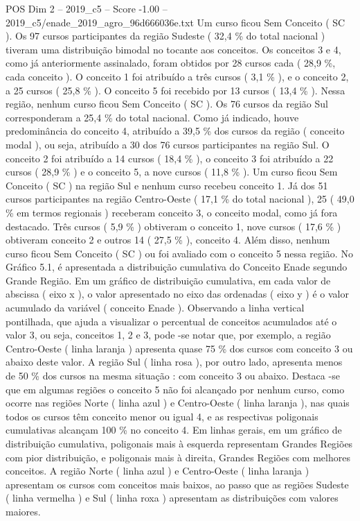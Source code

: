 \begin{textsample}{POS Dim 2 – 2019\_c5 – Score -1.00 – 2019\_c5/enade\_2019\_agro\_96d666036e.txt}
Um curso ficou Sem Conceito ( SC ).
Os 97 cursos participantes da região Sudeste ( 32,4 \% do total nacional ) tiveram uma distribuição bimodal no tocante aos conceitos.
Os conceitos 3 e 4, como já anteriormente assinalado, foram obtidos por 28 cursos cada ( 28,9 \%, cada conceito ).
O conceito 1 foi atribuído a três cursos ( 3,1 \% ), e o conceito 2, a 25 cursos ( 25,8 \% ).
O conceito 5 foi recebido por 13 cursos ( 13,4 \% ).
Nessa região, nenhum curso ficou Sem Conceito ( SC ).
Os 76 cursos da região Sul corresponderam a 25,4 \% do total nacional.
Como já indicado, houve predominância do conceito 4, atribuído a 39,5 \% dos cursos da região ( conceito modal ), ou seja, atribuído a 30 dos 76 cursos participantes na região Sul.
O conceito 2 foi atribuído a 14 cursos ( 18,4 \% ), o conceito 3 foi atribuído a 22 cursos ( 28,9 \% ) e o conceito 5, a nove cursos ( 11,8 \% ).
Um curso ficou Sem Conceito ( SC ) na região Sul e nenhum curso recebeu conceito 1.
Já dos 51 cursos participantes na região Centro-Oeste ( 17,1 \% do total nacional ), 25 ( 49,0 \% em termos regionais ) receberam conceito 3, o conceito modal, como já fora destacado.
Três cursos ( 5,9 \% ) obtiveram o conceito 1, nove cursos ( 17,6 \% ) obtiveram conceito 2 e outros 14 ( 27,5 \% ), conceito 4.
Além disso, nenhum curso ficou Sem Conceito ( SC ) ou foi avaliado com o conceito 5 nessa região.
No Gráfico 5.1, é apresentada a distribuição cumulativa do Conceito Enade segundo Grande Região.
Em um gráfico de distribuição cumulativa, em cada valor de abscissa ( eixo x ), o valor apresentado no eixo das ordenadas ( eixo y ) é o valor acumulado da variável ( conceito Enade ).
Observando a linha vertical pontilhada, que ajuda a visualizar o percentual de conceitos acumulados até o valor 3, ou seja, conceitos 1, 2 e 3, pode -se notar que, por exemplo, a região Centro-Oeste ( linha laranja ) apresenta quase 75 \% dos cursos com conceito 3 ou abaixo deste valor.
A região Sul ( linha rosa ), por outro lado, apresenta menos de 50 \% dos cursos na mesma situação : com conceito 3 ou abaixo.
Destaca -se que em algumas regiões o conceito 5 não foi alcançado por nenhum curso, como ocorre nas regiões Norte ( linha azul ) e Centro-Oeste ( linha laranja ), nas quais todos os cursos têm conceito menor ou igual 4, e as respectivas poligonais cumulativas alcançam 100 \% no conceito 4.
Em linhas gerais, em um gráfico de distribuição cumulativa, poligonais mais à esquerda representam Grandes Regiões com pior distribuição, e poligonais mais à direita, Grandes Regiões com melhores conceitos.
A região Norte ( linha azul ) e Centro-Oeste ( linha laranja ) apresentam os cursos com conceitos mais baixos, ao passo que as regiões Sudeste ( linha vermelha ) e Sul ( linha roxa ) apresentam as distribuições com valores maiores.

\end{textsample}
